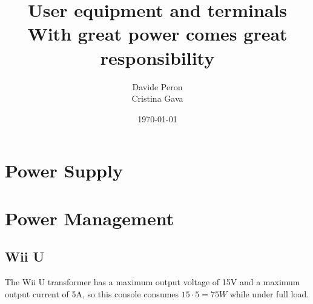 \documentclass[11pt,a4paper,titlepage]{article}
\title{\blue User equipment and terminals \\
\blueb With great power comes great responsibility}
\author{Davide Peron\\ Cristina Gava}
\date{\today}
\begin{document}
\maketitle

\tableofcontents
\clearpage

\section{Power Supply} \label{sec:power_supply}

\section{Power Management} \label{sec:power_management}
	\subsection{Wii U}
		The Wii U transformer has a maximum output voltage of 15V and a maximum output current of 5A, so this console consumes $15\cdot 5 = 75W$ while under full load.
\end{document}
